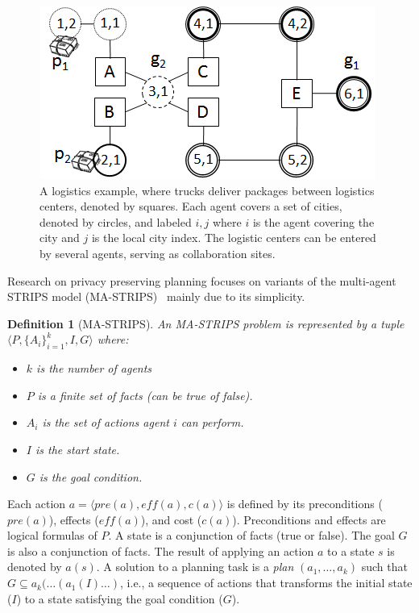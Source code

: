 \documentclass[letterpaper]{article}
\newcommand{\eff}{\textit{eff}}
\newcommand{\pre}{\textit{pre}}
\newtheorem{definition}{Definition}
\theoremstyle{definition}
\begin{document}
\begin{figure}
\centering
\includegraphics[width=\columnwidth]{Logistics}
\caption{A logistics example, where trucks deliver packages between logistics centers, denoted by squares. Each agent covers a set of cities, denoted by circles, and labeled $i,j$ where $i$ is the agent covering the city and $j$ is the local city index. The logistic centers can be entered by several agents, serving as collaboration sites.}
\label{fig:logistics}
\end{figure}


Research on privacy preserving planning focuses on variants of the multi-agent STRIPS model (MA-STRIPS)~\cite{brafman2013complexity} mainly due to its simplicity.



\begin{definition}[MA-STRIPS]
An MA-STRIPS problem is represented by a tuple $\langle P, \{A_i\}_{i=1}^k, I ,G \rangle$ where:
\begin{itemize}
\item $k$ is the number of agents
\item $P$ is a finite set of facts (can be true of false).
\item $A_i$ is the set of actions agent $i$ can perform.
\item $I$ is the start state.
\item $G$ is the goal condition.
\end{itemize}
\label{def:ma-strips}
\end{definition}
Each action $a=\langle \pre(a), \eff(a), c(a) \rangle$ is defined by its preconditions ($\pre(a)$), effects ($\eff(a)$), and cost ($c(a)$). Preconditions and effects are logical formulas of $P$. A state is a conjunction of facts (true or false). The goal $G$ is also a conjunction of facts. The result of applying an action $a$ to a state $s$ is denoted by $a(s)$. A solution to a planning task is a {\em plan} $(a_1,\ldots,a_k)$ such that $G\subseteq a_k(\ldots(a_1(I)\ldots)$, i.e., a sequence of actions that transforms the initial state ($I$) to a state satisfying the goal condition ($G$).
\end{document}
